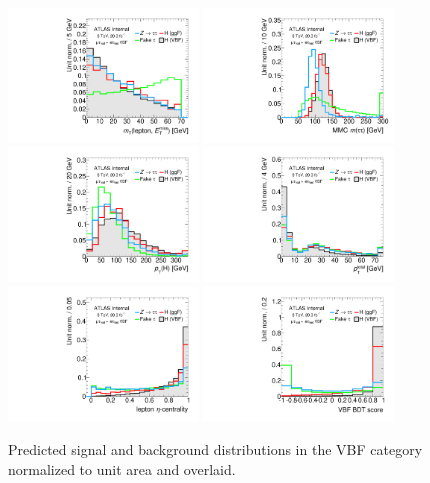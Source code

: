 \begin{figure}[tp]
  \centering
  \includegraphics[width=0.45\textwidth]{figures/overlaid/vbf/mT}
  \includegraphics[width=0.45\textwidth]{figures/overlaid/vbf/mMMC}
  \includegraphics[width=0.45\textwidth]{figures/overlaid/vbf/H-pt-hi}
  \includegraphics[width=0.45\textwidth]{figures/overlaid/vbf/system-pt}
  \includegraphics[width=0.45\textwidth]{figures/overlaid/vbf/lep-eta-centrality}
  \includegraphics[width=0.45\textwidth]{figures/overlaid/vbf/BDTEve-VBF}
  \caption{Predicted signal and background distributions in the VBF category normalized to unit area and overlaid.}
  \label{fig:strategy-overlaid-vbf-other}
\end{figure}
